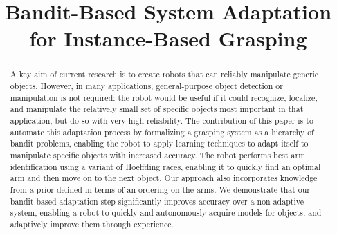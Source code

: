 \documentclass{article}
\title{Bandit-Based System Adaptation for
  Instance-Based Grasping}
\author{}
\begin{document}
\maketitle

\begin{abstract}
A key aim of current research is to create robots that can reliably
manipulate generic objects.  However, in many applications,
general-purpose object detection or manipulation is not required: the
robot would be useful if it could recognize, localize, and manipulate
the relatively small set of specific objects most important in that
application, but do so with very high reliability.  The contribution
of this paper is to automate this adaptation process by formalizing a
grasping system as a hierarchy of bandit problems, enabling the robot
to apply learning techniques to adapt itself to manipulate specific
objects with increased accuracy.  The robot performs best arm
identification using a variant of Hoeffding races, enabling it to
quickly find an optimal arm and then move on to the next object.  Our
approach also incorporates knowledge from a prior defined in terms of
an ordering on the arms.  We demonstrate that our bandit-based
adaptation step significantly improves accuracy over a non-adaptive
system, enabling a robot to quickly and autonomously acquire models
for objects, and adaptively improve them through experience.





\end{abstract}
\end{document}
